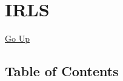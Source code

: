 \chapter*{\color{headtoc} IRLS}
\hypertarget{ecldoc:toc:root/IRLS}{}
\hyperlink{ecldoc:toc:root}{Go Up}


\section*{Table of Contents}
{\renewcommand{\arraystretch}{1.5}
\begin{longtable}{|p{\textwidth}|}
\hline
\end{longtable}
}

